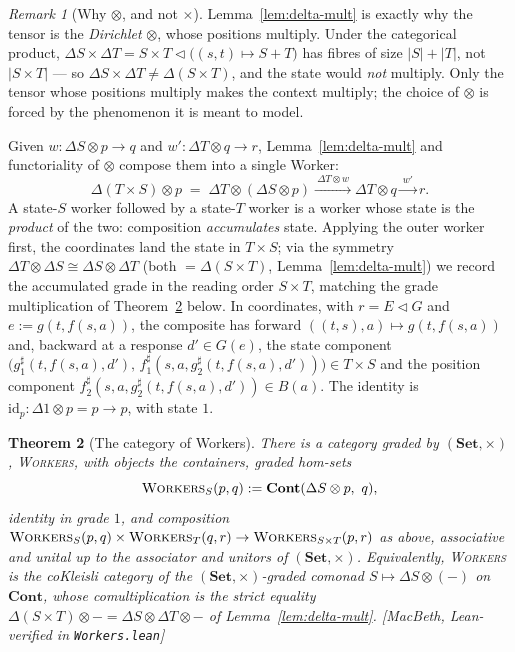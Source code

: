 \documentclass[11pt,a4paper]{book}
\newcommand{\Set}{\mathbf{Set}}
\newcommand{\Cont}{\mathbf{Cont}}
\newcommand{\cont}[2]{#1 \triangleleft #2}
\newcommand{\id}{\mathrm{id}}
\newcommand{\sh}{\sharp}
\newcommand{\Workers}{\textup{\textsc{Workers}}}
\theoremstyle{plain}
\newtheorem{Theorem}{Theorem}[chapter]
\theoremstyle{definition}
\theoremstyle{remark}
\newtheorem{Remark}[Theorem]{Remark}
\newcommand{\prov}[1]{\hfill\textsf{\footnotesize[#1]}}
\begin{document}
\begin{Remark}[Why $\otimes$, and not $\times$]\label{rem:why-otimes}
Lemma~\ref{lem:delta-mult} is exactly why the tensor is the \emph{Dirichlet} $\otimes$, whose positions
multiply. Under the categorical product, $\Delta S\times\Delta T=\cont{S\times T}{\bigl((s,t)\mapsto S+T\bigr)}$
has fibres of size $|S|+|T|$, not $|S\times T|$ --- so $\Delta S\times\Delta T\neq\Delta(S\times T)$, and the
state would \emph{not} multiply. Only the tensor whose positions multiply makes the context multiply; the
choice of $\otimes$ is forced by the phenomenon it is meant to model.
\end{Remark}

Given $w\colon\Delta S\otimes p\to q$ and $w'\colon\Delta T\otimes q\to r$, Lemma~\ref{lem:delta-mult} and
functoriality of $\otimes$ compose them into a single Worker:
\[
  \Delta(T\times S)\otimes p
  \;=\;\Delta T\otimes(\Delta S\otimes p)
  \xrightarrow{\ \Delta T\otimes w\ }\Delta T\otimes q
  \xrightarrow{\ w'\ } r .
\]
A state-$S$ worker followed by a state-$T$ worker is a worker whose state is the \emph{product} of the two:
composition \emph{accumulates} state. Applying the outer worker first, the coordinates land the state in
$T\times S$; via the symmetry $\Delta T\otimes\Delta S\cong\Delta S\otimes\Delta T$ (both $=\Delta(S\times T)$,
Lemma~\ref{lem:delta-mult}) we record the accumulated grade in the reading order $S\times T$, matching the
grade multiplication of Theorem~\ref{thm:workers} below. In coordinates, with $r=\cont EG$ and
$e:=g(t,f(s,a))$, the composite has forward $((t,s),a)\mapsto g(t,f(s,a))$ and, backward at a response
$d'\in G(e)$, the state component
$\bigl(g^{\sh}_{1}(t,f(s,a),d'),\,f^{\sh}_{1}(s,a,g^{\sh}_{2}(t,f(s,a),d'))\bigr)\in T\times S$ and the
position component $f^{\sh}_{2}(s,a,g^{\sh}_{2}(t,f(s,a),d'))\in B(a)$. The identity is
$\id_{p}\colon\Delta 1\otimes p=p\to p$, with state $1$.

\begin{Theorem}[The category of Workers]\label{thm:workers}
There is a category \emph{graded by $(\Set,\times)$}, \Workers{}, with objects the containers,
graded hom-sets
\[
  \Workers{}_{S}(p,q):=\Cont(\Delta S\otimes p,\ q),
\]
identity in grade $1$, and composition
$\Workers{}_{S}(p,q)\times\Workers{}_{T}(q,r)\to\Workers{}_{S\times T}(p,r)$ as above,
associative and unital up to the associator and unitors of $(\Set,\times)$. Equivalently,
\Workers{} is the coKleisli category of the $(\Set,\times)$-graded comonad $S\mapsto\Delta S\otimes(-)$
on $\Cont$, whose comultiplication is the strict equality $\Delta(S\times T)\otimes-=\Delta S\otimes\Delta T\otimes-$
of Lemma~\ref{lem:delta-mult}.
\prov{MacBeth, Lean-verified in \texttt{Workers.lean}\protect\footnotemark}
\end{Theorem}
\end{document}
